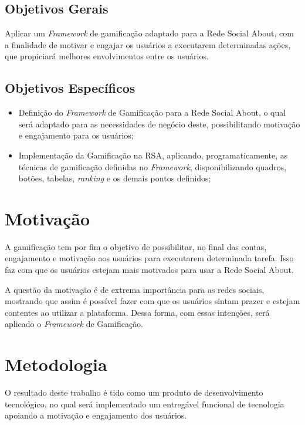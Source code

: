 \subsection{Objetivos Gerais}
Aplicar um \textit{Framework} de  gamificação adaptado para a Rede Social About,
com a finalidade de motivar e engajar os usuários a executarem determinadas
ações, que propiciará melhores envolvimentos entre os usuários.
\subsection{Objetivos Específicos}
\begin{itemize}
    \item Definição do \textit{Framework} de Gamificação para a Rede Social About,
        o qual será adaptado para as necessidades de negócio deste, possibilitando
        motivação e engajamento para os usuários;
    \item Implementação da Gamificação na RSA, aplicando, programaticamente, as técnicas
        de gamificação definidas no \textit{Framework}, disponibilizando quadros, botões,
        tabelas, \textit{ranking} e os demais pontos definidos;
\end{itemize}
\section{Motivação}
A gamificação tem por fim o objetivo de 
possibilitar, no final das contas, engajamento e motivação aos usuários para
executarem determinada tarefa. Isso faz com que os usuários estejam mais
motivados para usar a Rede Social About. 

A questão da motivação é de extrema importância para as redes sociais, mostrando
que assim é possível fazer com que os usuários sintam prazer e estejam
contentes ao utilizar a plataforma. Dessa forma, com essas intenções,
será aplicado o \textit{Framework} de Gamificação.

\section{Metodologia}
O resultado deste trabalho é tido como um produto de desenvolvimento tecnológico, no qual será implementado
um entregável funcional de tecnologia apoiando a motivação e engajamento dos usuários.

